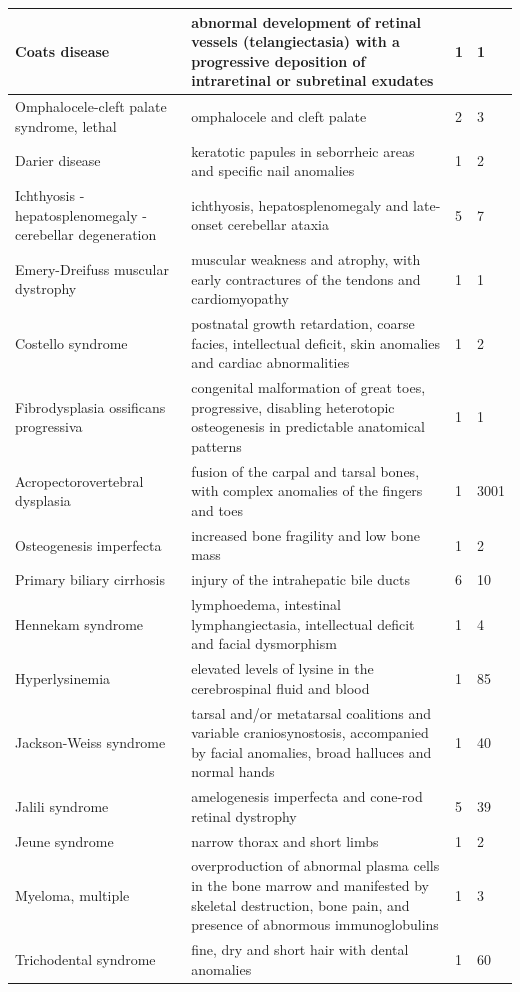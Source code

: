 \documentclass[10pt,letterpaper,final]{article}
\begin{document}
\begin{center}
\begin{small}
\begin{longtable}{|p{3.5cm}|p{4.5cm}|p{1.8cm}|p{1.8cm}|}
    Coats disease & abnormal development of retinal vessels (telangiectasia) with a progressive deposition of intraretinal or subretinal exudates & 1 & 1\\    \hline
    Omphalocele-cleft palate syndrome, lethal & omphalocele and cleft palate & 2 & 3\\    \hline
    Darier disease & keratotic papules in seborrheic areas and specific nail anomalies & 1 & 2\\    \hline
    Ichthyosis - hepatosplenomegaly - cerebellar degeneration & ichthyosis, hepatosplenomegaly and late-onset cerebellar ataxia & 5 & 7\\    \hline
    Emery-Dreifuss muscular dystrophy & muscular weakness and atrophy, with early contractures of the tendons and cardiomyopathy & 1 & 1\\    \hline
    Costello syndrome & postnatal growth retardation, coarse facies, intellectual deficit, skin anomalies and cardiac abnormalities & 1 & 2\\    \hline
    Fibrodysplasia ossificans progressiva & congenital malformation of great toes, progressive, disabling heterotopic osteogenesis in predictable anatomical patterns & 1 & 1\\    \hline
    Acropectorovertebral dysplasia & fusion of the carpal and tarsal bones, with complex anomalies of the fingers and toes & 1 & 3001\\    \hline
    Osteogenesis imperfecta & increased bone fragility and low bone mass & 1 & 2\\    \hline
    Primary biliary cirrhosis & injury of the intrahepatic bile ducts & 6 & 10\\    \hline
    Hennekam syndrome & lymphoedema, intestinal lymphangiectasia, intellectual deficit and facial dysmorphism & 1 & 4\\    \hline
    Hyperlysinemia & elevated levels of lysine in the cerebrospinal fluid and blood & 1 & 85\\    \hline
    Jackson-Weiss syndrome & tarsal and/or metatarsal coalitions and variable craniosynostosis, accompanied by facial anomalies, broad halluces and normal hands & 1 & 40\\    \hline
    Jalili syndrome & amelogenesis imperfecta and cone-rod retinal dystrophy & 5 & 39 \\    \hline
    Jeune syndrome & narrow thorax and short limbs & 1 & 2\\    \hline
    Myeloma, multiple & overproduction of abnormal plasma cells in the bone marrow and manifested by skeletal destruction, bone pain, and presence of abnormous immunoglobulins & 1 & 3\\    \hline
    Trichodental syndrome & fine, dry and short hair with dental anomalies & 1 & 60\\    \hline
    \end{longtable}
\end{small}
\end{center}
\end{document}
